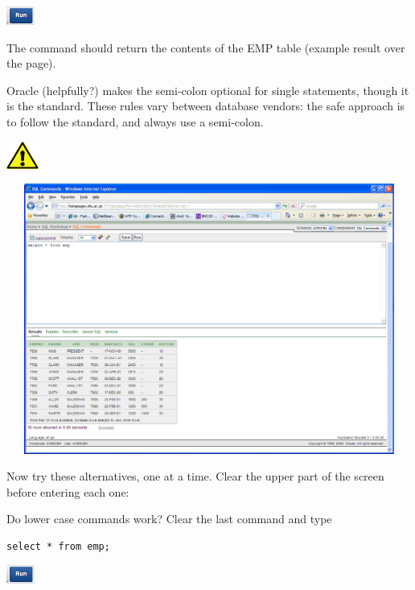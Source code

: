 \includegraphics[width=0.947cm,height=0.607cm]{images/img (9).png}

The command should return the contents of the EMP table (example result over the page).

Oracle (helpfully?) makes the semi-colon optional for single statements, though it is the standard. These rules vary between database vendors: the {\textquotedbl}safe{\textquotedbl} approach is to follow the standard, and always use a semi-colon.

\begin{center}
  
\includegraphics[width=1.058cm,height=0.903cm]{images/img (2).png}

\end{center}
   
\includegraphics[width=14.785cm,height=8.871cm]{images/img (10).png}
 

Now try these alternatives, one at a time. Clear the upper part of the screen before entering each one:

Do lower case commands work? Clear the last command and type

\begin{lstlisting}
select * from emp; 
\end{lstlisting}

\includegraphics[width=0.947cm,height=0.607cm]{images/img (9).png}

